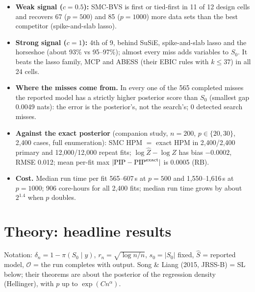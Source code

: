 \documentclass[10pt]{article}
\newcommand{\Shat}{\hat S}
\begin{document}
{\small
\begin{itemize}
\item \textbf{Weak signal ($c=0.5$):} SMC-BVS is first or tied-first in 11 of 12 design cells and recovers 67 ($p=500$) and 85 ($p=1000$) more data sets than the best competitor (spike-and-slab lasso).
\item \textbf{Strong signal ($c=1$):} 4th of 9, behind SuSiE, spike-and-slab lasso and the horseshoe (about 93\% vs 95--97\%); almost every miss adds variables to $S_0$. It beats the lasso family, MCP and ABESS (their EBIC rules with $k\le37$) in all 24 cells.
\item \textbf{Where the misses come from.} In every one of the 565 completed misses the reported model has a strictly higher posterior score than $S_0$ (smallest gap 0.0049 nats): the error is the posterior's, not the search's; 0 detected search misses.
\item \textbf{Against the exact posterior} (companion study, $n=200$, $p\in\{20,30\}$, 2,400 cases, full enumeration): SMC HPM $=$ exact HPM in 2,400/2,400 primary and 12,000/12,000 repeat fits; $\log\hat Z-\log Z$ has bias $-0.0002$, RMSE 0.012; mean per-fit max $|\mathrm{PIP}-\mathrm{PIP}^{\rm exact}|$ is 0.0005 (RB).
\item \textbf{Cost.} Median run time per fit 565--607\,s at $p=500$ and 1,550--1,616\,s at $p=1000$; 906 core-hours for all 2,400 fits; median run time grows by about $2^{1.4}$ when $p$ doubles.
\end{itemize}}

\section{Theory: headline results}

Notation: $\delta_n=1-\pi(S_0\mid y)$, $r_n=\sqrt{\log n/n}$, $s_0=|S_0|$ fixed, $\Shat$ = reported model, $\mathcal O$ = the run completes with output.
Song \& Liang (2015, JRSS-B) = SL below; their theorems are about the posterior of the regression density (Hellinger), with $p$ up to $\exp(Cn^\alpha)$.
\end{document}
